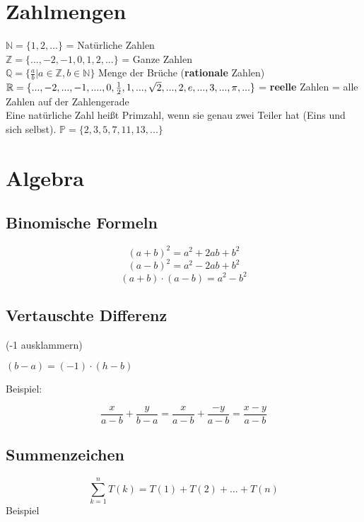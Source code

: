 \arbeitsblattHeader{}
 \begin{multicols}{2}

\section{Zahlmengen}

$\mathbb{N} = \{1,2, ...\}  $ = Natürliche Zahlen\\
$\mathbb{Z} = \{..., -2, -1, 0, 1,2, ...\}  $ = Ganze Zahlen\\
$\mathbb{Q} = \{\frac{a}b | a\in \mathbb{Z}, b\in\mathbb{N}\}$ Menge der Brüche (\textbf{rationale} Zahlen)\\
$\mathbb{R} = \{..., -2, ..., -1, ...., 0,
\frac12, 1,...,\sqrt{2},...,2, e,\\
..., 3, ..., \pi, ...\}  $ = \textbf{reelle} Zahlen = alle Zahlen auf der Zahlengerade\\

Eine natürliche Zahl heißt Primzahl, wenn sie genau zwei Teiler hat (Eins und sich selbst). $\mathbb{P} = \{2, 3, 5, 7, 11, 13, ...\}$

\hrulefill

\section{Algebra}
\subsection{Binomische Formeln}

$$(a+b)^2 = a^2+2ab + b^2$$
$$(a-b)^2=a^2-2ab+b^2$$
$$(a+b)\cdot(a-b) = a^2 - b^2$$

\hrulefill

\subsection{Vertauschte Differenz}
(-1 ausklammern)

$(b-a)=(-1)\cdot{}(h-b)$

Beispiel:

$$\frac{x}{a-b} +  \frac{y}{b-a} = \frac{x}{a-b} + \frac{-y}{a-b} = \frac{x-y}{a-b}$$

\hrulefill

\subsection{Summenzeichen}
$$\sum_{k=1}^n{T(k)} = T(1) + T(2) + ... + T(n)$$
Beispiel


\end{multicols}
